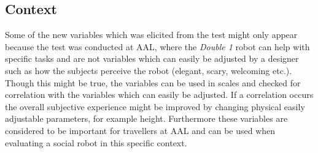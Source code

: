 \subsection{Context}
 Some of the new variables which was elicited from the test might only appear because the test was conducted at AAL, where the \textit{Double 1} robot can help with specific tasks and are not variables which can easily be adjusted by a designer such as how the subjects perceive the robot (elegant, scary, welcoming etc.). Though this might be true, the variables can be used in scales and checked for correlation with the variables which can easily be adjusted. If a correlation occurs the overall subjective experience might be improved by changing physical easily adjustable parameters, for example height. Furthermore these variables are considered to be important for travellers at AAL and can be used when evaluating a social robot in this specific context. 